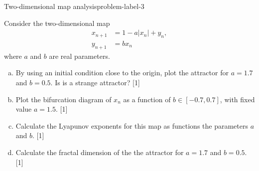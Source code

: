 \begin{problem}{Two-dimensional map analysis}{problem-label-3}

Consider the two-dimensional map
\begin{align*}
    x_{n+1} &= 1-a|x_n|+y_n, \\
    y_{n+1} &= bx_n
\end{align*}
where $a$ and $b$ are real parameters.

\begin{enumerate}[(a)]
    \item By using an initial condition close to the origin, plot the attractor
    for $a=1.7$ and $b=0.5$. Is is a strange attractor? [1]
    \item Plot the bifurcation diagram of $x_n$ as a function of $b \in [-0.7, 0.7]$,
    with fixed value $a=1.5$. [1]
    \item Calculate the Lyapunov exponents for this map as functions the parameters $a$ and $b$. [1]
    \item Calculate the fractal dimension of the the attractor for $a=1.7$ and $b=0.5$. [1] 
\end{enumerate}
\end{problem}

